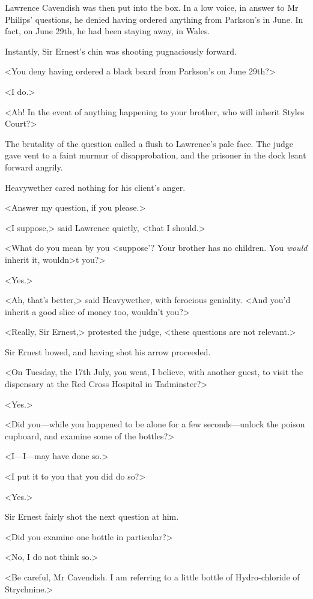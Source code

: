  Lawrence Cavendish was then put into the box. In a low voice, in answer to Mr Philips' questions, he denied having ordered anything from Parkson's in June. In fact, on June 29th, he had been staying away, in Wales. 

 Instantly, Sir Ernest's chin was shooting pugnaciously forward. 

 <You deny having ordered a black beard from Parkson's on June 29th?> 

 <I do.> 

 <Ah! In the event of anything happening to your brother, who will inherit Styles Court?> 

 The brutality of the question called a flush to Lawrence's pale face. The judge gave vent to a faint murmur of disapprobation, and the prisoner in the dock leant forward angrily. 

 Heavywether cared nothing for his client's anger. 

 <Answer my question, if you please.> 

 <I suppose,> said Lawrence quietly, <that I should.> 

 <What do you mean by you <suppose'? Your brother has no children. You \emph{would} inherit it, wouldn>t you?> 

 <Yes.> 

 <Ah, that's better,> said Heavywether, with ferocious geniality. <And you'd inherit a good slice of money too, wouldn't you?> 

 <Really, Sir Ernest,> protested the judge, <these questions are not relevant.> 

 Sir Ernest bowed, and having shot his arrow proceeded. 

 <On Tuesday, the 17th July, you went, I believe, with another guest, to visit the dispensary at the Red Cross Hospital in Tadminster?> 

 <Yes.> 

 <Did you—while you happened to be alone for a few seconds—unlock the poison cupboard, and examine some of the bottles?> 

 <I—I—may have done so.> 

 <I put it to you that you did do so?> 

 <Yes.> 

 Sir Ernest fairly shot the next question at him. 

 <Did you examine one bottle in particular?> 

 <No, I do not think so.> 

 <Be careful, Mr Cavendish. I am referring to a little bottle of Hydro-chloride of Strychnine.> 

